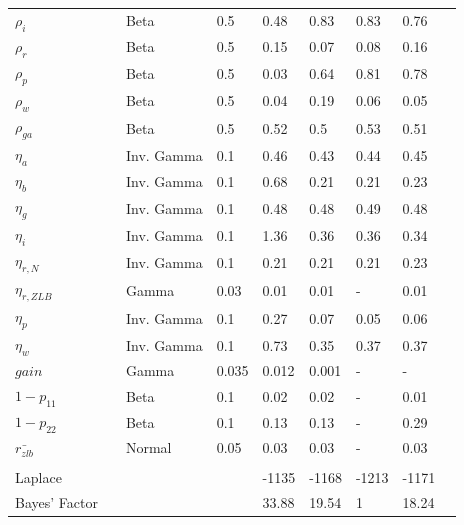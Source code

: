 \documentclass[12pt,reqno]{article}
\numberwithin{equation}{section}
\begin{document}
\begin{table}[H]
\begin{tabular}{llll|ll|lll}
$\rho_i$ &  & Beta & 0.5 			& 0.48 & 0.83 & 0.83 & 0.76 \\
$\rho_r$ &  & Beta & 0.5 			& 0.15 & 0.07 & 0.08 & 0.16 \\
$\rho_p$ &  & Beta & 0.5 			& 0.03 & 0.64 & 0.81 & 0.78 \\
$\rho_w$ &  & Beta & 0.5 			& 0.04 & 0.19 & 0.06 & 0.05 \\
$\rho_{ga}$ &  & Beta & 0.5 		& 0.52 & 0.5 & 0.53 & 0.51 \\
$\eta_a$ &  & Inv. Gamma & 0.1 		& 0.46 & 0.43 & 0.44 & 0.45 \\
$\eta_b$ &  & Inv. Gamma & 0.1 		& 0.68 & 0.21 & 0.21 & 0.23 \\
$\eta_g$ &  & Inv. Gamma & 0.1 		& 0.48 & 0.48 & 0.49 & 0.48 \\
$\eta_i$ &  & Inv. Gamma & 0.1 		& 1.36 & 0.36 & 0.36 & 0.34 \\
$\eta_{r,N}$ &  & Inv. Gamma & 0.1 	& 0.21 & 0.21 & 0.21 & 0.23 \\
$\eta_{r,ZLB}$ &  & Gamma & 0.03 	& 0.01 & 0.01 & - & 0.01 \\
$\eta_p$ &  & Inv. Gamma & 0.1 		& 0.27 & 0.07 & 0.05 & 0.06 \\
$\eta_w$ &  & Inv. Gamma & 0.1 		& 0.73 & 0.35 & 0.37 & 0.37 \\
$gain$ &  & Gamma & 0.035 			& 0.012 & 0.001 & - &  -\\
$1-p_{11}$ &  & Beta & 0.1 			& 0.02 & 0.02 & - & 0.01 \\
$1-p_{22}$ &  & Beta & 0.1 			& 0.13 & 0.13 & - & 0.29 \\
$\bar{r_{zlb}}$ &  & Normal & 0.05 	& 0.03 & 0.03 & - & 0.03 \\
 &  &  &  &  &  &  &  \\
Laplace &  &  &  & -1135 & -1168 & -1213 & -1171 \\
Bayes’ Factor &  &  &  & 33.88 & 19.54 & 1 & 18.24 \\
\end{tabular}
\end{table}
\end{document}
